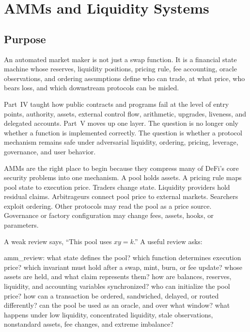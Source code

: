 \chapter{AMMs and Liquidity Systems}

\section{Purpose}

\begin{principlebox}
An automated market maker is not just a swap function. It is a financial state machine whose reserves, liquidity positions, pricing rule, fee accounting, oracle observations, and ordering assumptions define who can trade, at what price, who bears loss, and which downstream protocols can be misled.
\end{principlebox}

Part~IV taught how public contracts and programs fail at the level of entry points, authority, assets, external control flow, arithmetic, upgrades, liveness, and delegated accounts. Part~V moves up one layer. The question is no longer only whether a function is implemented correctly. The question is whether a protocol mechanism remains safe under adversarial liquidity, ordering, pricing, leverage, governance, and user behavior.

AMMs are the right place to begin because they compress many of DeFi's core security problems into one mechanism. A pool holds assets. A pricing rule maps pool state to execution price. Traders change state. Liquidity providers hold residual claims. Arbitrageurs connect pool price to external markets. Searchers exploit ordering. Other protocols may read the pool as a price source. Governance or factory configuration may change fees, assets, hooks, or parameters.

A weak review says, ``This pool uses \(x y = k\).'' A useful review asks:

\begin{codeblock}
amm_review:
    what state defines the pool?
    which function determines execution price?
    which invariant must hold after a swap, mint, burn, or fee update?
    whose assets are held, and what claim represents them?
    how are balances, reserves, liquidity, and accounting variables synchronized?
    who can initialize the pool price?
    how can a transaction be ordered, sandwiched, delayed, or routed differently?
    can the pool be used as an oracle, and over what window?
    what happens under low liquidity, concentrated liquidity, stale observations,
    nonstandard assets, fee changes, and extreme imbalance?
\end{codeblock}

